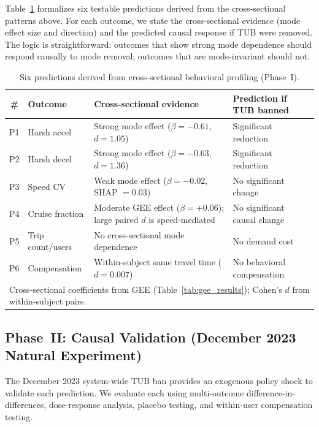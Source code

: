 Table~\ref{tab:predictions} formalizes six testable predictions derived from the cross-sectional patterns above. For each outcome, we state the cross-sectional evidence (mode effect size and direction) and the predicted causal response if TUB were removed. The logic is straightforward: outcomes that show strong mode dependence should respond causally to mode removal; outcomes that are mode-invariant should not.

\begin{table}[htbp]
\centering
\caption{Six predictions derived from cross-sectional behavioral profiling (Phase~I).}
\label{tab:predictions}
\small
\begin{tabular}{clp{4.2cm}p{4.2cm}}
\toprule
\textbf{\#} & \textbf{Outcome} & \textbf{Cross-sectional evidence} & \textbf{Prediction if TUB banned} \\
\midrule
P1 & Harsh accel & Strong mode effect ($\beta = -0.61$, $d = 1.05$) & Significant reduction \\
P2 & Harsh decel & Strong mode effect ($\beta = -0.63$, $d = 1.36$) & Significant reduction \\
P3 & Speed CV & Weak mode effect ($\beta = -0.02$, SHAP $= 0.03$) & No significant change \\
P4 & Cruise fraction & Moderate GEE effect ($\beta = +0.06$); large paired $d$ is speed-mediated & No significant causal change \\
P5 & Trip count/users & No cross-sectional mode dependence & No demand cost \\
P6 & Compensation & Within-subject same travel time ($d = 0.007$) & No behavioral compensation \\
\bottomrule
\multicolumn{4}{l}{\footnotesize Cross-sectional coefficients from GEE (Table~\ref{tab:gee_results}); Cohen's $d$ from within-subject pairs.} \\
\end{tabular}
\end{table}

\subsection{Phase~II: Causal Validation (December 2023 Natural Experiment)}
\label{sec:res_validation}

The December 2023 system-wide TUB ban provides an exogenous policy shock to validate each prediction. We evaluate each using multi-outcome difference-in-differences, dose-response analysis, placebo testing, and within-user compensation testing.

